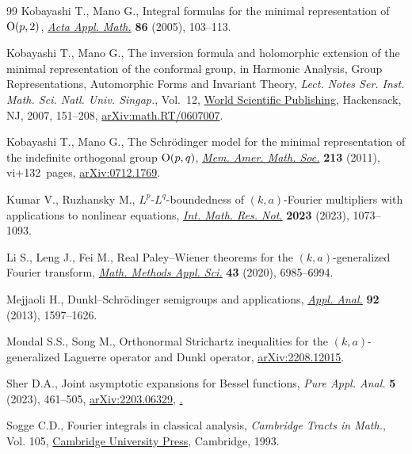 \documentclass[pdftex]{sigma}
\numberwithin{equation}{section}
\begin{document}
\begin{thebibliography}{99}
Kobayashi T., Mano G., Integral formulas for the minimal representation of
 {${\rm O}(p,2)$}, \href{https://doi.org/10.1007/s10440-005-0464-2}{\textit{Acta Appl. Math.}} \textbf{86} (2005), 103--113.

Kobayashi T., Mano G., The inversion formula and holomorphic extension of the
 minimal representation of the conformal group, in Harmonic {A}nalysis,
 {G}roup {R}epresentations, {A}utomorphic {F}orms and {I}nvariant {T}heory,
 \textit{Lect. Notes Ser. Inst. Math. Sci. Natl. Univ. Singap.}, Vol.~12,
 \href{https://doi.org/10.1142/9789812770790_0006}{World Scientific Publishing}, Hackensack, NJ, 2007, 151--208,
 \href{https://arxiv.org/abs/math.RT/0607007}{arXiv:math.RT/0607007}.

Kobayashi T., Mano G., The {S}chr\"odinger model for the minimal representation
 of the indefinite orthogonal group {${\rm O}(p,q)$}, \href{https://doi.org/10.1090/S0065-9266-2011-00592-7}{\textit{Mem. Amer. Math.
 Soc.}} \textbf{213} (2011), vi+132~pages, \href{https://arxiv.org/abs/0712.1769}{arXiv:0712.1769}.

Kumar V., Ruzhansky M., {$L^p$}-{$L^q$}-boundedness of {$(k,a)$}-{F}ourier
 multipliers with applications to nonlinear equations, \href{https://doi.org/10.1093/imrn/rnab256}{\textit{Int. Math. Res.
 Not.}} \textbf{2023} (2023), 1073--1093.

Li S., Leng J., Fei M., Real {P}aley--{W}iener theorems for the
 {$(k,a)$}-generalized {F}ourier transform, \href{https://doi.org/10.1002/mma.6449}{\textit{Math. Methods Appl. Sci.}}
 \textbf{43} (2020), 6985--6994.

Mejjaoli H., Dunkl--{S}chr\"odinger semigroups and applications, \href{https://doi.org/10.1080/00036811.2012.692780}{\textit{Appl.
 Anal.}} \textbf{92} (2013), 1597--1626.

Mondal S.S., Song M., Orthonormal Strichartz inequalities for the
 {$(k,a)$}-generalized {L}aguerre operator and {D}unkl operator,
 \href{https://arxiv.org/abs/2208.12015}{arXiv:2208.12015}.

Sher D.A., Joint asymptotic expansions for {B}essel functions, \textit{Pure
 Appl. Anal.} \textbf{5} (2023), 461--505, \href{https://arxiv.org/abs/2203.06329}{arXiv:2203.06329},
 \href{https://doi.org/10.2140/paa.2023.5.461}.

Sogge C.D., Fourier integrals in classical analysis, \textit{Cambridge Tracts
 in Math.}, Vol. 105, \href{https://doi.org/10.1017/CBO9780511530029}{Cambridge University Press}, Cambridge, 1993.


\end{thebibliography}
\end{document}
